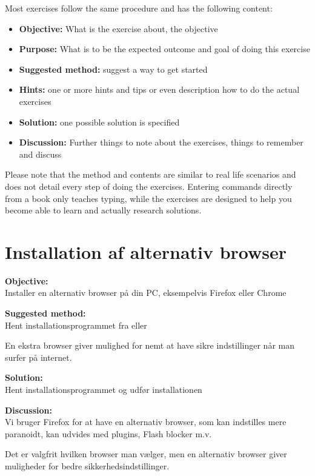 \documentclass[a4paper,11pt,notitlepage]{report}
\begin{document}
Most exercises follow the same procedure and has the following content:
\begin{itemize}
\item {\bf Objective:} What is the exercise about, the objective
\item {\bf Purpose:} What is to be the expected outcome and goal of doing this exercise
\item {\bf Suggested method:} suggest a way to get started
\item {\bf Hints:} one or more hints and tips or even description how to
do the actual exercises
\item {\bf Solution:} one possible solution is specified
\item {\bf Discussion:} Further things to note about the exercises, things to remember and discuss
\end{itemize}

Please note that the method and contents are similar to real life scenarios and does not detail every step of doing the exercises. Entering commands directly from a book only teaches typing, while the exercises are designed to help you become able to learn and actually research solutions.




\chapter{Installation af alternativ browser}
\label{ex:browser-install}

{\bf Objective:}\\
Installer en alternativ browser på din PC, eksempelvis Firefox eller Chrome

{\bf Suggested method:}\\
Hent installationsprogrammet fra  eller 



En ekstra browser giver mulighed for nemt at have sikre indstillinger når man surfer på internet.

{\bf Solution:}\\
Hent installationsprogrammet og udfør installationen

{\bf Discussion:}\\
Vi bruger Firefox for at have en alternativ browser, som kan indstilles mere paranoidt, kan udvides med plugins, Flash blocker m.v.

Det er valgfrit hvilken browser man vælger, men en alternativ browser giver muligheder for bedre sikkerhedsindstillinger.
\end{document}
